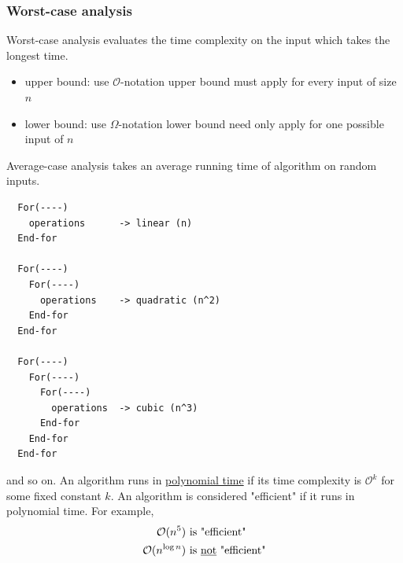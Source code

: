 \subsubsection*{Worst-case analysis}
Worst-case analysis evaluates the time complexity on the input which takes the longest time.
\begin{itemize}
  \item upper bound: use $\mathcal{O}$-notation
        \subitem upper bound must apply for every input of size $n$
  \item lower bound: use $\Omega$-notation
        \subitem lower bound need only apply for one possible input of $n$
\end{itemize}
Average-case analysis takes an average running time of algorithm on random inputs.
\begin{lstlisting}
  For(----)
    operations      -> linear (n)
  End-for

  For(----)
    For(----)
      operations    -> quadratic (n^2)
    End-for
  End-for

  For(----)
    For(----)
      For(----)
        operations  -> cubic (n^3)
      End-for
    End-for
  End-for
\end{lstlisting}
and so on. An algorithm runs in \underline{polynomial time} if its time complexity is $\mathcal{O}^k$ for some fixed constant $k$.
An algorithm is considered "efficient" if it runs in polynomial time. For example,
\begin{align*}
  \mathcal{O}(n^5)        & ~\text{is "efficient"}                 \\
  \mathcal{O}(n^{\log n}) & ~\text{is \underline{not} "efficient"}
\end{align*}
